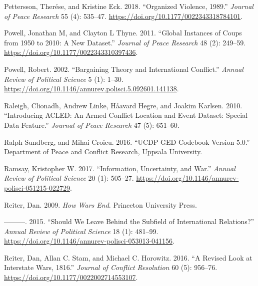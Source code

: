 \documentclass{article}
\newlength{\cslhangindent}
\newlength{\cslentryspacingunit} %
\newenvironment{CSLReferences}[2] %
 {%
  \setlength{\parindent}{0pt}
  \ifodd #1
  \let\oldpar\par
  \def\par{\hangindent=\cslhangindent\oldpar}
  \fi
  \setlength{\parskip}{#2\cslentryspacingunit}
 }%
 {}
\begin{document}
\begin{CSLReferences}{1}{0}
\leavevmode{}%
Pettersson, Therése, and Kristine Eck. 2018. {``Organized Violence,
1989.''} \emph{Journal of Peace Research} 55 (4):
535--47. \url{https://doi.org/10.1177/0022343318784101}.

\leavevmode{}%
Powell, Jonathan M, and Clayton L Thyne. 2011. {``Global Instances of
Coups from 1950 to 2010: {A} New Dataset.''} \emph{Journal of Peace
Research} 48 (2): 249--59.
\url{https://doi.org/10.1177/0022343310397436}.

\leavevmode{}%
Powell, Robert. 2002. {``Bargaining {Theory} and {International
Conflict}.''} \emph{Annual Review of Political Science} 5 (1): 1--30.
\url{https://doi.org/10.1146/annurev.polisci.5.092601.141138}.

\leavevmode{}%
Raleigh, Clionadh, Andrew Linke, Håavard Hegre, and Joakim Karlsen.
2010. {``Introducing {ACLED}: An Armed Conflict Location and Event
Dataset: Special Data Feature.''} \emph{Journal of Peace Research} 47
(5): 651--60.

\leavevmode{}%
Ralph Sundberg, and Mihai Croicu. 2016. {``{UCDP GED Codebook} Version
5.0.''} {Department of Peace and Conflict Research, Uppsala University}.

\leavevmode{}%
Ramsay, Kristopher W. 2017. {``Information, {Uncertainty}, and {War}.''}
\emph{Annual Review of Political Science} 20 (1): 505--27.
\url{https://doi.org/10.1146/annurev-polisci-051215-022729}.

\leavevmode{}%
Reiter, Dan. 2009. \emph{How Wars End}. {Princeton University Press}.

\leavevmode{}%
---------. 2015. {``Should {We Leave Behind} the {Subfield} of
{International Relations}?''} \emph{Annual Review of Political Science}
18 (1): 481--99.
\url{https://doi.org/10.1146/annurev-polisci-053013-041156}.

\leavevmode{}%
Reiter, Dan, Allan C. Stam, and Michael C. Horowitz. 2016. {``A {Revised
Look} at {Interstate Wars}, 1816.''} \emph{Journal of
Conflict Resolution} 60 (5): 956--76.
\url{https://doi.org/10.1177/0022002714553107}.


\end{CSLReferences}
\end{document}
